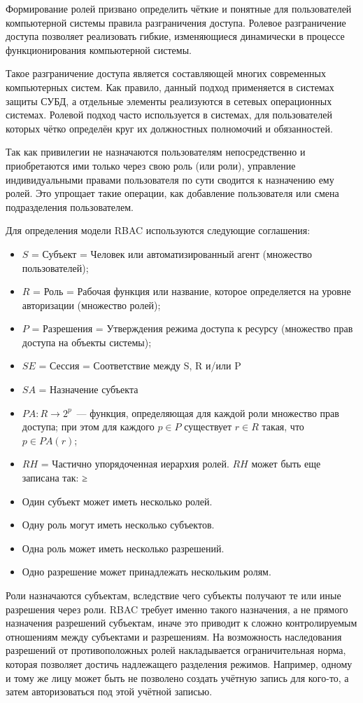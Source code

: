 Формирование ролей призвано определить чёткие и понятные для пользователей компьютерной системы правила разграничения доступа. Ролевое разграничение доступа позволяет реализовать гибкие, изменяющиеся динамически в процессе функционирования компьютерной системы.

Такое разграничение доступа является составляющей многих современных компьютерных систем. Как правило, данный подход применяется в системах защиты СУБД, а отдельные элементы реализуются в сетевых операционных системах. Ролевой подход часто используется в системах, для пользователей которых чётко определён круг их должностных полномочий и обязанностей.

Так как привилегии не назначаются пользователям непосредственно и приобретаются ими только через свою роль (или роли), управление индивидуальными правами пользователя по сути сводится к назначению ему ролей. Это упрощает такие операции, как добавление пользователя или смена подразделения пользователем.

Для определения модели RBAC используются следующие соглашения:
\begin{itemize}
\item $S$ = Субъект = Человек или автоматизированный агент (множество пользователей);
\item $R$ = Роль  = Рабочая функция или название, которое определяется на уровне авторизации (множество ролей);
\item $P$ = Разрешения = Утверждения режима доступа к ресурсу (множество прав доступа на объекты системы);
\item $SE$ = Сессия = Соответствие между S, R и/или P
\item $SA$ = Назначение субъекта
\item $PA: R \to 2^p$ — функция, определяющая для каждой роли множество прав доступа; при этом для каждого $p \in P$ существует $r \in R$ такая, что $p \in PA(r)$;
\item $RH$ = Частично упорядоченная иерархия ролей. $RH$ может быть еще записана так: ≥
\item Один субъект может иметь несколько ролей.
\item Одну роль могут иметь несколько субъектов.
\item Одна роль может иметь несколько разрешений.
\item Одно разрешение может принадлежать нескольким ролям.
\end{itemize}


Роли назначаются субъектам, вследствие чего субъекты получают те или иные разрешения через роли. RBAC требует именно такого назначения, а не прямого назначения разрешений субъектам, иначе это приводит к сложно контролируемым отношениям между субъектами и разрешениям. На возможность наследования разрешений от противоположных ролей накладывается ограничительная норма, которая позволяет достичь надлежащего разделения режимов. Например, одному и тому же лицу может быть не позволено создать учётную запись для кого-то, а затем авторизоваться под этой учётной записью.

